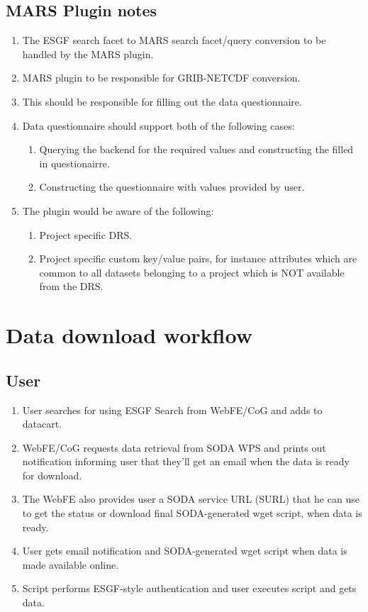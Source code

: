 \documentclass[oneside,12pt]{memoir}
\begin{document}
\subsection{MARS Plugin notes}
\begin{enumerate}
\item The ESGF search facet to MARS search facet/query conversion to be handled by the MARS plugin.
\item MARS plugin to be responsible for GRIB-NETCDF conversion.
\item This should be responsible for filling out the data questionnaire.
\item Data questionnaire should support both of the following cases:
\begin{enumerate}
\item Querying the backend for the required values and constructing the filled in questionairre.
\item Constructing the questionnaire with values provided by user.
\end{enumerate}
\item The plugin would be aware of the following:
\begin{enumerate}
\item Project specific DRS.
\item Project specific custom key/value pairs, for instance attributes which are common to all datasets belonging to a project which is NOT available from the DRS.
\end{enumerate}
\end{enumerate}

\section{Data download workflow}
\subsection{User}
\begin{enumerate}
\item User searches for using ESGF Search from WebFE/CoG and adds to datacart.
\item WebFE/CoG requests data retrieval from SODA WPS and prints out notification informing user that they'll get an email when the data is ready for download. \item The WebFE also provides user a SODA service URL (SURL) that he can use to get the status or download final SODA-generated wget script, when data is ready.
\item User gets email notification and SODA-generated wget script when data is made available online.
\item Script performs ESGF-style authentication and user executes script and gets data.
\end{enumerate}
\end{document}
